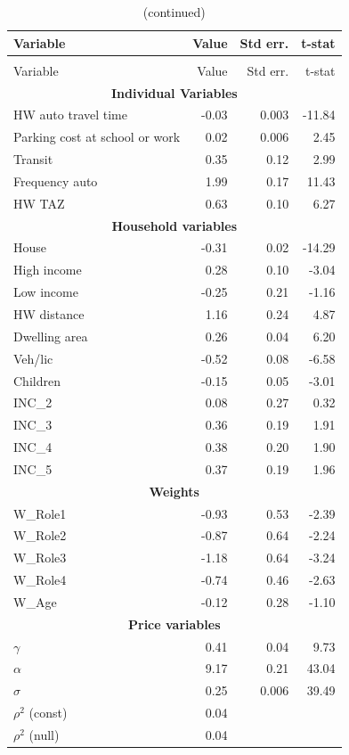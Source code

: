 \begin{longtable}{lrrr}
\caption{Model parameter statistics.}
\label{tab:model_sum} \\
\toprule
Variable &    Value &  Std err. &    t-stat \\
\midrule
\endfirsthead
\caption[]{(continued)}\\
\toprule
Variable &    Value &  Std err. &    t-stat \\
\midrule
\endhead
\multicolumn{4}{c}{\textbf{Individual Variables}} \\
HW auto travel time & -0.03 & 0.003 & -11.84 \\
Parking cost at school or work & 0.02 & 0.006 & 2.45 \\
Transit & 0.35 & 0.12 & 2.99 \\
Frequency auto & 1.99 & 0.17 & 11.43 \\
HW TAZ & 0.63 & 0.10 & 6.27 \\
\multicolumn{4}{c}{\textbf{Household variables}} \\
House & -0.31 & 0.02 & -14.29 \\
High income & 0.28 & 0.10 & -3.04 \\
Low income & -0.25 & 0.21 & -1.16 \\
HW distance & 1.16 & 0.24 & 4.87 \\
Dwelling area & 0.26 & 0.04 & 6.20 \\
Veh/lic & -0.52 & 0.08 & -6.58 \\
Children & -0.15 & 0.05 & -3.01  \\
INC\_2 & 0.08 & 0.27 & 0.32 \\
INC\_3 & 0.36 & 0.19 & 1.91 \\
INC\_4 & 0.38 & 0.20 & 1.90 \\
INC\_5 & 0.37 & 0.19 & 1.96 \\
\multicolumn{4}{c}{\textbf{Weights}} \\
W\_Role1 & -0.93 & 0.53 & -2.39 \\
W\_Role2 & -0.87 & 0.64 & -2.24 \\
W\_Role3 & -1.18 & 0.64 & -3.24 \\
W\_Role4 & -0.74 & 0.46 & -2.63 \\
W\_Age & -0.12 & 0.28 & -1.10 \\
\multicolumn{4}{c}{\textbf{Price variables}} \\
$\gamma$ & 0.41 & 0.04 & 9.73 \\
$\alpha$ & 9.17 & 0.21 & 43.04 \\
$\sigma$ & 0.25 & 0.006 & 39.49 \\
$\rho^2$ (const) & 0.04 & & \\ 
$\rho^2$ (null) & 0.04 & & \\ %
\bottomrule
\end{longtable}


